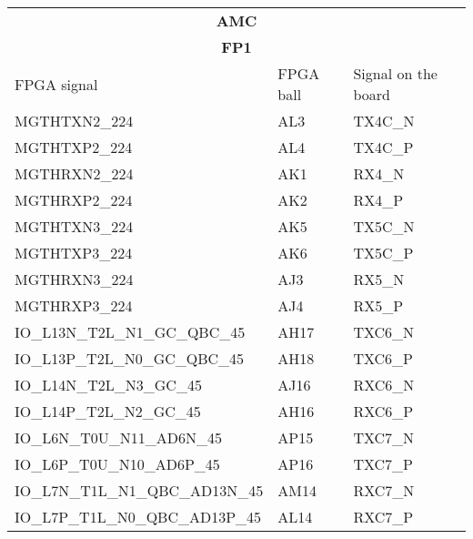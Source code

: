 %	

\begin{footnotesize}
	\begin{longtable}{|p{7cm}|p{1cm}|p{5cm}|}
		\hline
		\multicolumn{3}{|c|}{\multirow{2}{*}{\textbf{\large{AMC}}}}\\
		\multicolumn{3}{|c|}{} \\ \hline 
		\multicolumn{3}{|c|}{\textbf{\large{FP1}}}\\ \hline
FPGA signal	&	FPGA ball	&	Signal on the board	\\ \hline
MGTHTXN2\_224	&	AL3	&	TX4C\_N	\\ \hline
MGTHTXP2\_224	&	AL4	&	TX4C\_P	\\ \hline
MGTHRXN2\_224	&	AK1	&	RX4\_N	\\ \hline
MGTHRXP2\_224	&	AK2	&	RX4\_P	\\ \hline
MGTHTXN3\_224	&	AK5	&	TX5C\_N	\\ \hline
MGTHTXP3\_224	&	AK6	&	TX5C\_P	\\ \hline
MGTHRXN3\_224	&	AJ3	&	RX5\_N	\\ \hline
MGTHRXP3\_224	&	AJ4	&	RX5\_P	\\ \hline
IO\_L13N\_T2L\_N1\_GC\_QBC\_45	&	AH17	&	TXC6\_N	\\ \hline
IO\_L13P\_T2L\_N0\_GC\_QBC\_45	&	AH18	&	TXC6\_P	\\ \hline
IO\_L14N\_T2L\_N3\_GC\_45	&	AJ16	&	RXC6\_N	\\ \hline
IO\_L14P\_T2L\_N2\_GC\_45	&	AH16	&	RXC6\_P	\\ \hline
IO\_L6N\_T0U\_N11\_AD6N\_45	&	AP15	&	TXC7\_N	\\ \hline
IO\_L6P\_T0U\_N10\_AD6P\_45	&	AP16	&	TXC7\_P	\\ \hline
IO\_L7N\_T1L\_N1\_QBC\_AD13N\_45	&	AM14	&	RXC7\_N	\\ \hline
IO\_L7P\_T1L\_N0\_QBC\_AD13P\_45	&	AL14	&	RXC7\_P	\\ \hline
		

\end{longtable}
\end{footnotesize}
